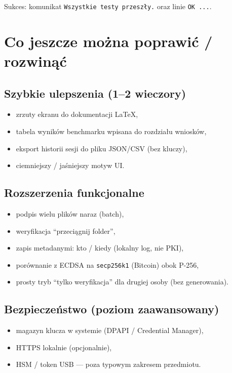 \documentclass[12pt,a4paper]{article}
\begin{document}
Sukces: komunikat \texttt{Wszystkie testy przeszły.} oraz linie \texttt{OK ...}.

\section{Co jeszcze można poprawić / rozwinąć}

\subsection{Szybkie ulepszenia (1--2 wieczory)}
\begin{itemize}[leftmargin=*]
  \item zrzuty ekranu do dokumentacji LaTeX,
  \item tabela wyników benchmarku wpisana do rozdziału wniosków,
  \item eksport historii sesji do pliku JSON/CSV (bez kluczy),
  \item ciemniejszy / jaśniejszy motyw UI.
\end{itemize}

\subsection{Rozszerzenia funkcjonalne}
\begin{itemize}[leftmargin=*]
  \item podpis wielu plików naraz (batch),
  \item weryfikacja ``przeciągnij folder'',
  \item zapis metadanymi: kto / kiedy (lokalny log, nie PKI),
  \item porównanie z ECDSA na \texttt{secp256k1} (Bitcoin) obok P-256,
  \item prosty tryb ``tylko weryfikacja'' dla drugiej osoby (bez generowania).
\end{itemize}

\subsection{Bezpieczeństwo (poziom zaawansowany)}
\begin{itemize}[leftmargin=*]
  \item magazyn klucza w systemie (DPAPI / Credential Manager),
  \item HTTPS lokalnie (opcjonalnie),
  \item HSM / token USB --- poza typowym zakresem przedmiotu.
\end{itemize}
\end{document}
